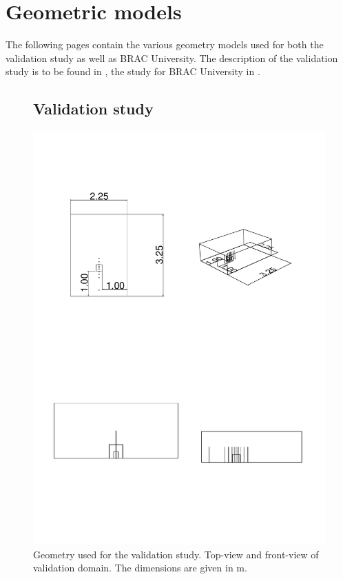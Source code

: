 
\chapter{Geometric models}
\label{chap:geometric_models}

The following pages contain the various geometry models used for both the validation study as well as BRAC University. The description of the validation study is to be found in , the study for BRAC University in .




\clearpage




\begin{figure}[!h]
	\section{Validation study}
	\centering
	\includegraphics[height=1.5\linewidth, trim = 0cm 5cm 10cm 2cm ,clip]{images/geometry/validation/Validation_scaled_down_4P}
	\captionsetup{format=plain}	
	\caption[Geometry used for the validation study; top-view and front-view]{Geometry used for the validation study. Top-view and front-view of validation domain. The dimensions are given in \si{\metre}.}
	\label{fig:validationscaleddown4p}
\end{figure}
